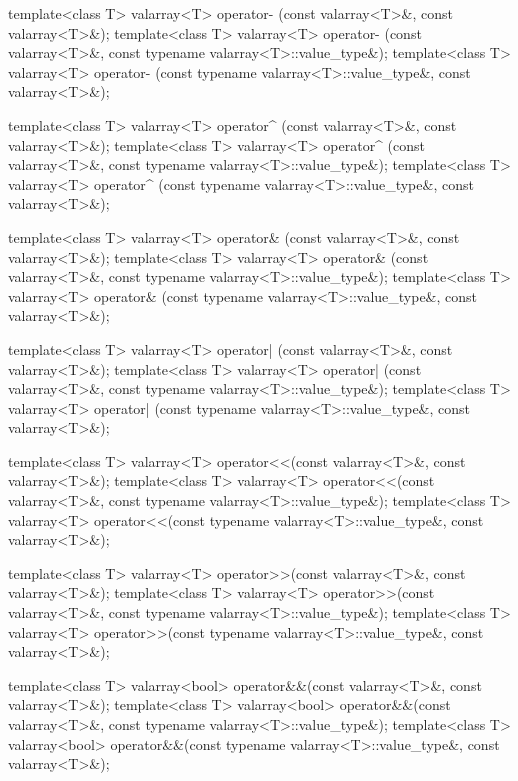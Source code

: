 \begin{codeblock}
{  template<class T> valarray<T> operator- (const valarray<T>&, const valarray<T>&);
  template<class T> valarray<T> operator- (const valarray<T>&,
                                           const typename valarray<T>::value_type&);
  template<class T> valarray<T> operator- (const typename valarray<T>::value_type&,
                                           const valarray<T>&);

  template<class T> valarray<T> operator^ (const valarray<T>&, const valarray<T>&);
  template<class T> valarray<T> operator^ (const valarray<T>&,
                                           const typename valarray<T>::value_type&);
  template<class T> valarray<T> operator^ (const typename valarray<T>::value_type&,
                                           const valarray<T>&);

  template<class T> valarray<T> operator& (const valarray<T>&, const valarray<T>&);
  template<class T> valarray<T> operator& (const valarray<T>&,
                                           const typename valarray<T>::value_type&);
  template<class T> valarray<T> operator& (const typename valarray<T>::value_type&,
                                           const valarray<T>&);

  template<class T> valarray<T> operator| (const valarray<T>&, const valarray<T>&);
  template<class T> valarray<T> operator| (const valarray<T>&,
                                           const typename valarray<T>::value_type&);
  template<class T> valarray<T> operator| (const typename valarray<T>::value_type&,
                                           const valarray<T>&);

  template<class T> valarray<T> operator<<(const valarray<T>&, const valarray<T>&);
  template<class T> valarray<T> operator<<(const valarray<T>&,
                                           const typename valarray<T>::value_type&);
  template<class T> valarray<T> operator<<(const typename valarray<T>::value_type&,
                                           const valarray<T>&);

  template<class T> valarray<T> operator>>(const valarray<T>&, const valarray<T>&);
  template<class T> valarray<T> operator>>(const valarray<T>&,
                                           const typename valarray<T>::value_type&);
  template<class T> valarray<T> operator>>(const typename valarray<T>::value_type&,
                                           const valarray<T>&);

  template<class T> valarray<bool> operator&&(const valarray<T>&, const valarray<T>&);
  template<class T> valarray<bool> operator&&(const valarray<T>&,
                                              const typename valarray<T>::value_type&);
  template<class T> valarray<bool> operator&&(const typename valarray<T>::value_type&,
                                              const valarray<T>&);

}
\end{codeblock}
